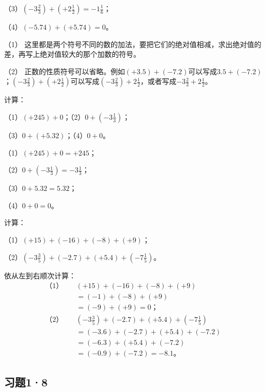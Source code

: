 （3）\(\left(-3\frac{2}{3}\right) + \left(+2\frac{1}{2}\right) = -1\frac{1}{6}\)；

（4）\((-5.74) + (+5.74) = 0\)。

 （1） 这里都是两个符号不同的数的加法，要把它们的绝对值相减，求出绝对值的差，再写上绝对值较大的那个加数的符号。

（2） 正数的性质符号可以省略。例如\((+3.5) + (-7.2)\)可以写成\(3.5 + (-7.2)\)；\(\left(-3\frac{2}{3}\right) + \left(+2\frac{1}{2}\right)\)可以写成\(\left(-3\frac{2}{3}\right) + 2\frac{1}{2}\)，或者写成\(-3\frac{2}{3} + 2\frac{1}{2}\)。

 计算：

（1）\((+245) + 0\)；\qquad （2）\(0 + \left(-3\frac{1}{3}\right)\)；

（3）\(0 + (+5.32)\)；\qquad （4）\(0 + 0\)。

 （1）\((+245) + 0 = +245\)；

（2）\(0 + \left(-3\frac{1}{3}\right) = -3\frac{1}{3}\)；

（3）\(0 + 5.32 = 5.32\)；

（4）\(0 + 0 = 0\)。

 计算：

（1）\((+15) + (-16) + (-8) + (+9)\)；

（2）\(\left(-3\frac{3}{5}\right) + (-2.7) + (+5.4) + \left(-7\frac{1}{5}\right)\)。

 依从左到右顺次计算：
\begin{align*}
\text{（1）}\quad & (+15) + (-16) + (-8) + (+9) \\
&= (-1) + (-8) + (+9) \\
&= (-9) + (+9) = 0；\\[6pt]
\text{（2）}\quad & \left(-3\frac{3}{5}\right) + (-2.7) + (+5.4) + \left(-7\frac{1}{5}\right) \\
&= (-3.6) + (-2.7) + (+5.4) + (-7.2) \\
&= (-6.3) + (+5.4) + (-7.2) \\
&= (-0.9) + (-7.2) = -8.1。
\end{align*}

\subsection{习题1·8}

